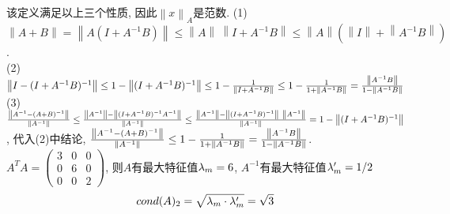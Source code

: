 \documentclass[UTF8,9pt]{ctexart}
\begin{document}
该定义满足以上三个性质, 因此$\left\|x\right\|_A$是范数.
(1) $\left\|A+B\right\|=\left\|A(I+A^{-1}B)\right\| \leq \left\|A\right\|\ \left\|I+A^{-1}B\right\| \leq \left\|A\right\|(\left\|I\right\|+\left\|A^{-1}B\right\|)$.\\
(2) $\left\|I-(I+A^{-1} B)^{-1}\right\| \leq 1-\left\|(I+A^{-1} B)^{-1}\right\| \leq 1-\frac{1}{\left\|I+A^{-1} B\right\|} \leq 1-\frac{1}{1+\left\|A^{-1} B\right\|}=\frac{\left\|A^{-1} B\right\|}{1-\left\|A^{-1} B\right\|} $\\
(3)$\frac{\left\|A^{-1}-(A+B)^{-1}\right\|}{\left\|A^{-1}\right\|} \leq \f{\left\|A^{-1}\right\|-\left\|(I+A^{-1}B)^{-1}A^{-1}\right\|}{\left\|A^{-1}\right\|} \leq \f{\left\|A^{-1}\right\|-\left\|(I+A^{-1}B)^{-1}\right\|\ \left\|A^{-1}\right\|}{\left\|A^{-1}\right\|}=1-\left\|(I+A^{-1}B)^{-1}\right\|$, 代入(2)中结论, $\frac{\left\|A^{-1}-(A+B)^{-1}\right\|}{\left\|A^{-1}\right\|} \leq 1-\frac{1}{1+\left\|A^{-1} B\right\|}=\frac{\left\|A^{-1} B\right\|}{1-\left\|A^{-1} B\right\|}$.\\
\qqed
{}
$A^TA=\begin{pmatrix}
    3  & 0 & 0 \\
    0 & 6 & 0 \\
    0  & 0 & 2
\end{pmatrix}$, 则$A$有最大特征值$\lambda_m=6$, $A^{-1}$有最大特征值$\lambda'_m=1/2$
$$cond(A)_2=\sqrt{\lambda_m\cdot\lambda'_m}=\sqrt{3}$$
\end{document}
